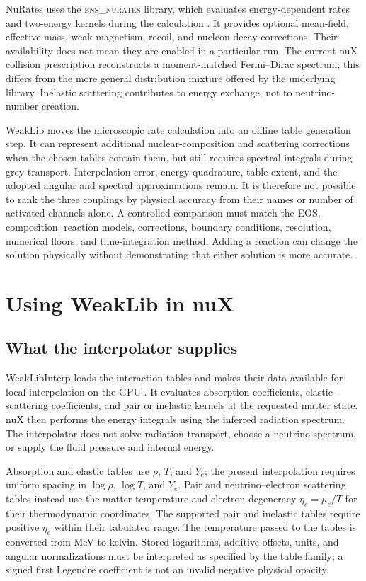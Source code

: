 \documentclass[aps,prd,reprint,nofootinbib,notitlepage]{revtex4-2}
\begin{document}
NuRates uses the \textsc{bns\_nurates} library, which evaluates
energy-dependent rates and two-energy kernels during the calculation
\cite{Chiesa2025,BNSNuRates}. It provides optional mean-field,
effective-mass, weak-magnetism, recoil, and nucleon-decay corrections.
Their availability does not mean they are enabled in a particular run.
The current nuX collision prescription reconstructs a moment-matched
Fermi--Dirac spectrum; this differs from the more general distribution
mixture offered by the underlying library. Inelastic scattering contributes
to energy exchange, not to neutrino-number creation.

WeakLib moves the microscopic rate calculation into an offline table
generation step. It can represent additional nuclear-composition and
scattering corrections when the chosen tables contain them, but still
requires spectral integrals during grey transport. Interpolation error,
energy quadrature, table extent, and the adopted angular and spectral
approximations remain. It is therefore not possible to rank the three
couplings by physical accuracy from their names or number of activated
channels alone. A controlled comparison must match the EOS, composition,
reaction models, corrections, boundary conditions, resolution, numerical
floors, and time-integration method. Adding a reaction can change the
solution physically without demonstrating that either solution is more
accurate.

\section{Using WeakLib in nuX}
\label{sec:usage}

\subsection{What the interpolator supplies}

WeakLibInterp loads the interaction tables and makes their data available
for local interpolation on the GPU \cite{WeakLibInterp}. It evaluates
absorption coefficients, elastic-scattering coefficients, and pair or
inelastic kernels at the requested matter state. nuX then performs the
energy integrals using the inferred radiation spectrum. The interpolator
does not solve radiation transport, choose a neutrino spectrum, or supply
the fluid pressure and internal energy.

Absorption and elastic tables use $\rho$, $T$, and $Y_e$; the present
interpolation requires uniform spacing in $\log\rho$, $\log T$, and $Y_e$.
Pair and neutrino--electron scattering tables instead use the matter
temperature and electron degeneracy $\eta_e=\mu_e/T$ for their thermodynamic
coordinates. The supported pair and inelastic tables require positive
$\eta_e$ within their tabulated range. The temperature passed to the tables
is converted from MeV to kelvin. Stored logarithms, additive offsets, units,
and angular normalizations must be interpreted as specified by the table
family; a signed first Legendre coefficient is not an invalid negative
physical opacity.
\end{document}
